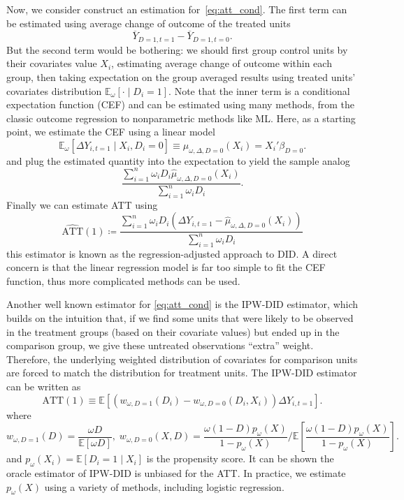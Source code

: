 \documentclass[12pt]{article}
\begin{document}
Now, we consider construct an estimation for~\eqref{eq:att_cond}. The first term can be
estimated using average change of outcome of the treated units
\[
  \overline{Y}_{D=1,t=1} - \overline{Y}_{D=1,t=0}
.\]
But the second term would be bothering: we
should first group control units by their covariates value \( X_i \), estimating average
change of outcome within each group, then taking expectation on the group averaged
results using treated
units' covariates distribution \( \mathbb{E}_{\omega }[ \cdot \mid D_i=1] \).
Note that the inner term is a conditional expectation function (CEF) and can be estimated
using many methods, from the
classic outcome regression to nonparametric methods like ML. Here, as a starting point,
we estimate the CEF using a linear model
\[
  \mathbb{E}_{\omega }[\Delta Y_{i,t=1} \mid X_i,D_i=0] \equiv \mu_{\omega, \Delta,
  D=0}(X_i) = X_i' \beta_{D=0}
.\]
and plug the estimated quantity into the expectation to yield the sample analog
\[
  \frac{\sum_{i=1}^{n} \omega_i D_i \hat{\mu}_{\omega,\Delta,D=0}(X_i)}{\sum_{i=1}^{n}\omega_i D_i}
.\]
Finally we can estimate ATT using
\begin{equation}
  \widehat{\text{ATT}}(1) \coloneqq \frac{\sum_{i=1}^{n} \omega_i D_i \left( \Delta
  Y_{i,t=1}-\hat{\mu}_{\omega,\Delta,D=0}(X_i) \right)}{\sum_{i=1}^{n}\omega_i D_i}
\end{equation}
this estimator is known as the regression-adjusted approach to DID\@. A direct concern is that the
linear regression model is far too simple to fit the CEF function, thus more complicated
methods can be used.

Another well known estimator for \eqref{eq:att_cond} is the IPW-DID estimator, which
builds on the intuition that,
if we find some units that were likely to be observed
in the treatment groups (based on their covariate values) but ended up in the comparison group,
we give these untreated observations “extra” weight. Therefore, the underlying weighted
distribution of covariates
for comparison units are forced to match the distribution for treatment units. The
IPW-DID estimator can be written as
\[
  \text{ATT}(1) \equiv \mathbb{E}[\left(w_{\omega,D=1}(D_i)-w_{\omega,
  D=0}(D_i,X_i)\right) \Delta Y_{i,t=1}]
.\]
where
\[
  w_{\omega,D=1}(D)= \frac{\omega D}{\mathbb{E}[\omega D]}, \; w_{\omega ,D=0}(X,D) =
  \frac{\omega (1-D) p_{\omega}(X)}{1-p_{\omega}(X)} \Big/ \mathbb{E} \left[\frac{\omega
  (1-D) p_{\omega}(X)}{1-p_{\omega}(X)}  \right]
.\]
and \( p_{\omega}(X_i) = \mathbb{E}[D_i=1 \mid X_i]\) is the propensity score. It can be
shown the oracle estimator of IPW-DID
is unbiased for the ATT. In practice, we estimate \( p_{\omega}(X) \) using a variety of
methods, including logistic regression.
\end{document}
